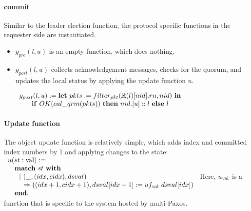 \paragraph{commit}
Similar to the leader election function, the protocol specific functions in the requester side are instantiated. 
\begin{itemize}[leftmargin=*]
\item $g_{pre} (l, u)$ is an empty function, which does nothing.
\item $g_{post} (l, u)$ collects acknowledgement messages, checks for the
	quorum, and updates the local status by applying the update function
		$u$.
\begin{small}
$
\begin{array}{c}
 g_{post} (l, u) :=  \mbox{\textbf{let}}\ pkts := filter_{pkt}(\replay(l)[nid].rn, nid) \ \mbox{\textbf{in}}\\
\mbox{\textbf{if}} \ OK(cal\_qrm(pkts)) \ \mbox{\textbf{then}} \ nid.[u]::l\ \mbox{\textbf{else}}\ l \\
\end{array}
$
\end{small}
\vspace{-0.5em}
\end{itemize}

\paragraph{Update function}
The object update function is relatively simple, 
which adds index and committed index numbers by 1 and applying changes to the
state:
$
\begin{array}{l}
u (st : \mathrm{val}) :=\\
\ \ \ \mbox{\textbf{match}} \ st \ \mbox{\textbf{with}}\\
	\ \ \ \ \ \vert~(\_, (idx, cidx), dsval) \\
	\ \ \ \ \ \ \  \Rightarrow ((idx + 1, cidx + 1), dsval[idx + 1] := uf_{\mathrm{val}}\ dsval[idx])\\
\ \ \ \mbox{\textbf{end}}.\\
\end{array}
$
Here, $u_{\mathrm{val}}$ is a function that is specific to the system hosted 
by multi-Paxos.
%
%
%
%


